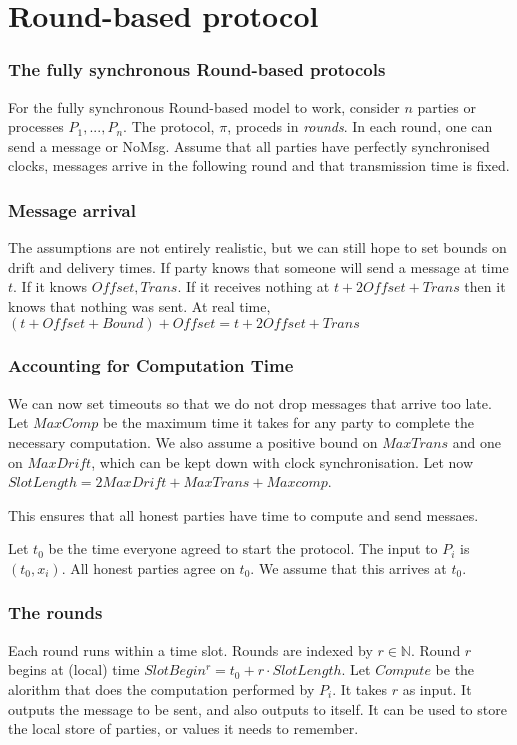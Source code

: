 \documentclass[14pt]{beamer}
\newcommand{\N}{\mathbb{N}}
\begin{document}
\section{Round-based protocol}
        \begin{frame}
            \frametitle{The fully synchronous Round-based protocols}
                For the fully synchronous Round-based model to work, consider $n$ parties or processes $P_1, ..., P_n$. The protocol, $\pi$, proceds in \textit{rounds}. In each round, one can send a message or NoMsg. Assume that all parties have perfectly synchronised clocks, messages arrive in the following round and that transmission time is fixed. 
        \end{frame}
        \begin{frame}
            \frametitle{Message arrival}
                The assumptions are not entirely realistic, but we can still hope to set bounds on drift and delivery times. If party knows that someone will send a message at time $t$. If it knows $Offset, Trans$. If it receives nothing at $t + 2Offset + Trans$ then it knows that nothing was sent. At real time, $(t + Offset + Bound) + Offset = t + 2Offset + Trans$
        \end{frame}
        \begin{frame}
            \frametitle{Accounting for Computation Time}
                We can now set timeouts so that we do not drop messages that arrive too late. Let $MaxComp$ be the maximum time it takes for any party to complete the necessary computation. We also assume a positive bound on $MaxTrans$ and one on $MaxDrift$, which can be kept down with clock synchronisation. Let now $SlotLength = 2MaxDrift + MaxTrans + Maxcomp$. 
                
                This ensures that all honest parties have time to compute and send messaes. 

                Let $t_0$ be the time everyone agreed to start the protocol. The input to $P_i$ is $(t_0, x_i)$. All honest parties agree on $t_0$. We assume that this arrives at $t_0$. 
        \end{frame}

        \begin{frame}
            \frametitle{The rounds}
                Each round runs within a time slot. Rounds are indexed by $r \in \N$. Round $r$ begins at (local) time $SlotBegin^r = t_0 + r \cdot SlotLength$. Let $Compute$ be the alorithm that does the computation performed by $P_i$. It takes $r$ as input. It outputs the message to be sent, and also outputs to itself. It can be used to store the local store of parties, or values it needs to remember. 
        \end{frame}
\end{document}
